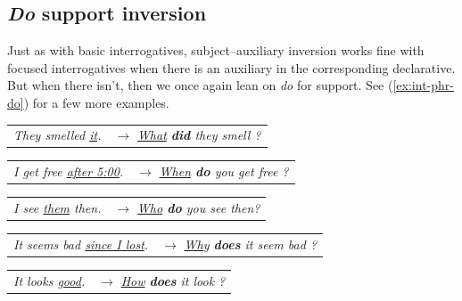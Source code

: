 \subsection{\textit{Do} support inversion}\label{sec:focused-do-support}

Just as with basic interrogatives, subject--auxiliary inversion works fine with focused interrogatives when there is an auxiliary in the corresponding declarative. But when there isn't, then we once again lean on \textit{do} for support. See (\ref{ex:int-phr-do}) for a few more examples.

\begin{exe}
    \ex
    \begin{xlist}
        \ex \label{ex:int-phr-do-a}
        \begin{tabular}[t]{@{}p{4.3cm}@{}p{6cm}@{}}
            \textit{They smelled \uline{it}.} & \(\rightarrow\) \textit{\uline{What} \textbf{did} they smell \uline{\phantom{it}}?}
        \end{tabular}
        
        \ex \label{ex:int-phr-do-b}
        \begin{tabular}[t]{@{}p{4.3cm}@{}p{6cm}@{}}
            \textit{I get free \uline{after 5:00}.} & \(\rightarrow\) \textit{\uline{When} \textbf{do} you get free \uline{\phantom{after 5:00}}?}
        \end{tabular}
        
        \ex 
        \begin{tabular}[t]{@{}p{4.3cm}@{}p{6cm}@{}}
            \textit{I see \uline{them} then.} & \(\rightarrow\) \textit{\uline{Who} \textbf{do} you see \uline{\phantom{them}} then?}
        \end{tabular}
        
        \ex 
        \begin{tabular}[t]{@{}p{4.3cm}@{}p{6cm}@{}}
            \textit{It seems bad \uline{since I lost}.} & \(\rightarrow\) \textit{\uline{Why} \textbf{does} it seem bad \uline{\phantom{since I lost}}?}
        \end{tabular}

        \ex 
        \begin{tabular}[t]{@{}p{4.3cm}@{}p{6cm}@{}}
            \textit{It looks \uline{good}.} & \(\rightarrow\) \textit{\uline{How} \textbf{does} it look \uline{\phantom{good}}?}
        \end{tabular}
    \end{xlist}
    \label{ex:int-phr-do}
\end{exe}


